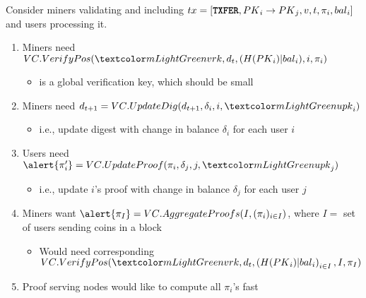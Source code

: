\begin{frame}
    Consider miners \alert{validating} and \alert{including} ${tx} = [\texttt{\textbf{TXFER}}, {PK}_i \rightarrow {PK}_j, v, {t}, {\pi_i}, {{bal}_i}]$ \pause\xspace and users \alert{processing} it.\pause
    \begin{enumerate}
        \item Miners need $\vcverifypos(\vrk, d_t, (H(\PK_i)|\bal_i), i, \pi_i)$\pause
        \begin{itemize}
            \item \vrk is a global \alert{verification key}, which should be small\pause
        \end{itemize}
        \item Miners need $d_{t+1}=\vccommupdate(d_{t+1}, \delta_i, i, \upk_i)$\pause %
        \begin{itemize}
            \item i.e., update digest with change in balance $\delta_i$ for each user $i$\pause
        \end{itemize}
        \item Users need $\alert{\pi_i'} = \vcproofupdate(\pi_i, \delta_j, j, \upk_j)$\pause
        \begin{itemize}
            \item i.e., update $i$'s proof with change in balance $\delta_j$ for each user $j$\pause
        \end{itemize}
        \item Miners want $\alert{\pi_I} = \vcaggregateproofs(I, (\pi_i)_{i\in I})$, where $I=$ set of users sending coins in a block\pause
        \begin{itemize}
            \item Would need corresponding $\vcverifypos(\vrk, d_t, \left(H(\PK_i)|\bal_i\right)_{i\in I}, I, \pi_I)$\pause
        \end{itemize}
        \item \alert{Proof serving nodes} would like to compute all $\pi_i$'s fast
    \end{enumerate}
\end{frame}

